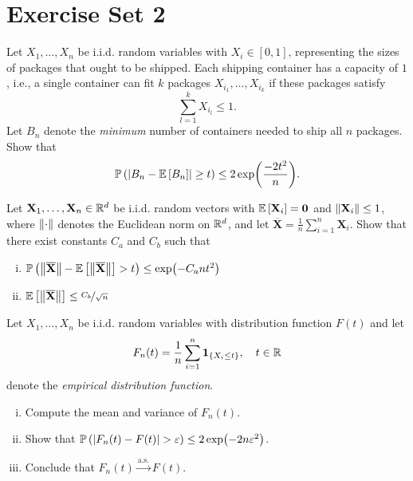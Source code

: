 \section{Exercise Set 2}

\begin{exercise}
Let $X_1, \dots, X_n$ be i.i.d. random variables with $X_i \in [0,1]$, representing the sizes of packages that ought to be shipped. Each shipping container has a capacity of $1$, i.e., a single container can fit $k$ packages $X_{i_1}, \dots, X_{i_k}$ if these packages satisfy
\[
    \sum_{l=1}^k X_{i_l} \leq 1.
\]
Let $B_n$ denote the \emph{minimum} number of containers needed to ship all $n$ packages. Show that
\[
    \mathbb{P}\left(\abs{B_n - \mathbb{E}\left[B_n\right]} \geq t\right) \leq 2 \exp(\frac{-2t^2}{n}).
\]
\end{exercise}


\begin{exercise}
Let $\mathbf{X}_1, \dots, \mathbf{X}_n \in \mathbb{R}^d$ be i.i.d. random vectors with $\mathbb{E}\left[\mathbf{X}_i\right] = \mathbf{0}$ and $\norm{\mathbf{X}_i} \leq 1$, where $\norm{\cdot}$ denotes the Euclidean norm on $\mathbb{R}^d$, and let $\overline{\mathbf{X}} = \frac{1}{n} \sum_{i=1}^n \mathbf{X}_i$. Show that there exist constants $C_a$ and $C_b$ such that
\begin{enumerate}[(i)]
    \item $\mathbb{P}\left(\norm{\overline{\mathbf{X}}} - \mathbb{E}\left[ \norm{\overline{\mathbf{X}}} \right] > t\right) \leq \exp(-C_a n t^2)$

    \item $\mathbb{E}\left[\norm{\overline{\mathbf{X}}}\right] \leq \nicefrac{C_b}{\sqrt{n}}$
\end{enumerate}
\end{exercise}


\begin{exercise}
Let $X_1, \dots, X_n$ be i.i.d. random variables with distribution function $F(t)$ and let
\[
    F_n(t) = \frac{1}{n} \sum_{i=1}^n \mathbf{1}_{\left\{X_i \leq t\right\}}, \quad t \in \mathbb{R}
\]
denote the \emph{empirical distribution function}.
\begin{enumerate}[(i)]
    \item Compute the mean and variance of $F_n(t)$.

    \item Show that $\mathbb{P}\left(\abs{ F_n(t) - F(t) } > \varepsilon\right) \leq 2 \exp(-2 n \varepsilon^2)$.

    \item Conclude that $F_n(t) \xrightarrow{\mathrm{a.s.}} F(t)$.
\end{enumerate}
\end{exercise}
